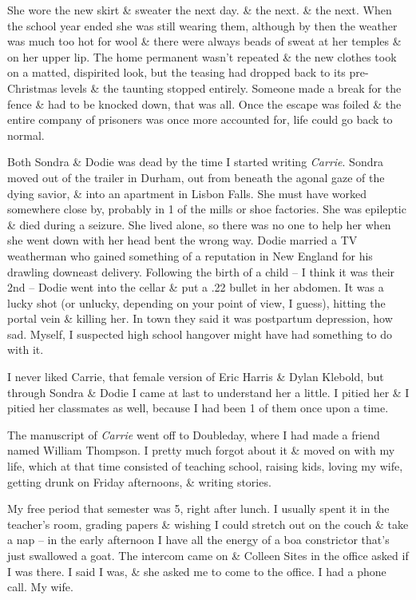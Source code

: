 \documentclass{article}
\numberwithin{equation}{section}
\begin{document}
She wore the new skirt \& sweater the next day. \& the next. \& the next. When the school year ended she was still wearing them, although by then the weather was much too hot for wool \& there were always beads of sweat at her temples \& on her upper lip. The home permanent wasn't repeated \& the new clothes took on a matted, dispirited look, but the teasing had dropped back to its pre-Christmas levels \& the taunting stopped entirely. Someone made a break for the fence \& had to be knocked down, that was all. Once the escape was foiled \& the entire company of prisoners was once more accounted for, life could go back to normal.

Both Sondra \& Dodie was dead by the time I started writing \textit{Carrie}. Sondra moved out of the trailer in Durham, out from beneath the agonal gaze of the dying savior, \& into an apartment in Lisbon Falls. She must have worked somewhere close by, probably in 1 of the mills or shoe factories. She was epileptic \& died during a seizure. She lived alone, so there was no one to help her when she went down with her head bent the wrong way. Dodie married a TV weatherman who gained something of a reputation in New England for his drawling downeast delivery. Following the birth of a child -- I think it was their 2nd -- Dodie went into the cellar \& put a .22 bullet in her abdomen. It was a lucky shot (or unlucky, depending on your point of view, I guess), hitting the portal vein \& killing her. In town they said it was postpartum depression, how sad. Myself, I suspected high school hangover might have had something to do with it.

I never liked Carrie, that female version of Eric Harris \& Dylan Klebold, but through Sondra \& Dodie I came at last to understand her a little. I pitied her \& I pitied her classmates as well, because I had been 1 of them once upon a time.

 The manuscript of \textit{Carrie} went off to Doubleday, where I had made a friend named William Thompson. I pretty much forgot about it \& moved on with my life, which at that time consisted of teaching school, raising kids, loving my wife, getting drunk on Friday afternoons, \& writing stories.

My free period that semester was 5, right after lunch. I usually spent it in the teacher's room, grading papers \& wishing I could stretch out on the couch \& take a nap -- in the early afternoon I have all the energy of a boa constrictor that's just swallowed a goat. The intercom came on \& Colleen Sites in the office asked if I was there. I said I was, \& she asked me to come to the office. I had a phone call. My wife.
\end{document}
